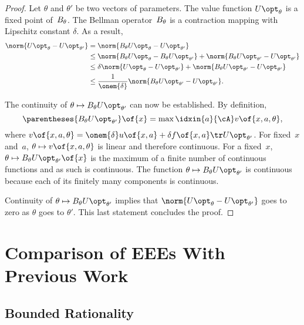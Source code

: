 \begin{proof}
Let \(\theta\) and \(\theta'\) be two vectors of parameters.
The value function \(\Utheta\) is a fixed point of~\(B_{\theta}\). The Bellman operator~\(B_{\theta}\) is a contraction mapping with Lipschitz constant \(\delta\). As a result,
\begin{align*}
\norm{\Utheta - \Uthetap} &= \norm{\Btheta \Utheta - \Uthetap} \\
&\le \norm{\Btheta \Utheta - \Btheta \Uthetap} + \norm{\Btheta\Uthetap - \Uthetap} \\
&\le \delta \norm{\Utheta - \Uthetap} + \norm{\Btheta\Uthetap - \Uthetap} \\
&\le \frac{1}{\onem{\delta}} \norm{\Btheta\Uthetap - \Uthetap}.
\end{align*}

The continuity of \(\theta \mapsto \Btheta \Uthetap\) can now be established.
By definition,
\begin{equation*}
\parentheses{\Btheta \Uthetap} \of{x} = \max\idxin{a}{\cA} v \of{x, a, \theta},
\end{equation*}
where \(v \of{x, a, \theta} = \onem{\delta} u \of{x, a} + \delta f \of{x, a}\tr \Uthetap\).
For fixed~\(x\) and~\(a\), \(\theta \mapsto v \of{x, a, \theta}\) is linear and therefore continuous.
For a fixed~\(x\), \(\theta \mapsto \Btheta \Uthetap \of{x}\) is the maximum of a finite number of continuous functions and as such is continuous.
The function \(\theta \mapsto \Btheta \Uthetap\) is continuous because each of its finitely many components is continuous.

Continuity of \(\theta \mapsto \Btheta \Uthetap\) implies that \(\norm{\Utheta - \Uthetap}\) goes to zero as \(\theta\) goes to \(\theta'\).
This last statement concludes the proof.
\end{proof}


\section{Comparison of EEEs With Previous Work}
\label{sec:comparison_of_eees_with_previous_work}


\subsection{Bounded Rationality}

